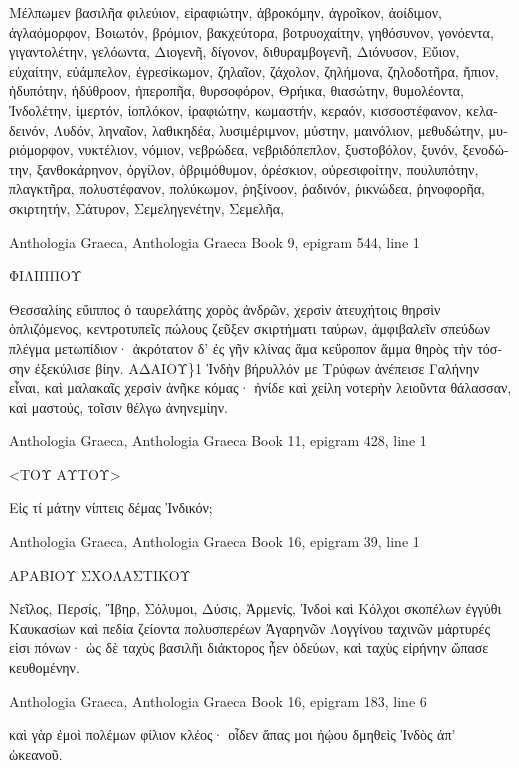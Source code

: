 \documentclass[12pt,letterpaper,twoside,final]{memoir}
\begin{document}
\begin{greek}
Μέλπωμεν βασιλῆα φιλεύιον, εἰραφιώτην, 
ἁβροκόμην, ἀγροῖκον, ἀοίδιμον, ἀγλαόμορφον, 
Βοιωτόν, βρόμιον, βακχεύτορα, βοτρυοχαίτην, 
γηθόσυνον, γονόεντα, γιγαντολέτην, γελόωντα, 
Διογενῆ, δίγονον, διθυραμβογενῆ, Διόνυσον, 
Εὔιον, εὐχαίτην, εὐάμπελον, ἐγρεσίκωμον, 
ζηλαῖον, ζάχολον, ζηλήμονα, ζηλοδοτῆρα, 
ἤπιον, ἡδυπότην, ἡδύθροον, ἠπεροπῆα, 
θυρσοφόρον, Θρήικα, θιασώτην, θυμολέοντα, 
Ἰνδολέτην, ἱμερτόν, ἰοπλόκον, ἰραφιώτην, 
κωμαστήν, κεραόν, κισσοστέφανον, κελαδεινόν, 
Λυδόν, ληναῖον, λαθικηδέα, λυσιμέριμνον, 
μύστην, μαινόλιον, μεθυδώτην, μυριόμορφον, 
νυκτέλιον, νόμιον, νεβρώδεα, νεβριδόπεπλον, 
ξυστοβόλον, ξυνόν, ξενοδώτην, ξανθοκάρηνον, 
ὀργίλον, ὀβριμόθυμον, ὀρέσκιον, οὐρεσιφοίτην, 
πουλυπότην, πλαγκτῆρα, πολυστέφανον, πολύκωμον, 
ῥηξίνοον, ῥαδινόν, ῥικνώδεα, ῥηνοφορῆα, 
σκιρτητήν, Σάτυρον, Σεμεληγενέτην, Σεμελῆα, 




Anthologia Graeca, Anthologia Graeca 
Book 9, epigram 544, line 1

ΦΙΛΙΠΠΟΥ


Θεσσαλίης εὔιππος ὁ ταυρελάτης χορὸς ἀνδρῶν, 
 χερσὶν ἀτευχήτοις θηρσὶν ὁπλιζόμενος, 
κεντροτυπεῖς πώλους ζεῦξεν σκιρτήματι ταύρων, 
 ἀμφιβαλεῖν σπεύδων πλέγμα μετωπίδιον· 
ἀκρότατον δ' ἐς γῆν κλίνας ἅμα κεὔροπον ἅμμα 
 θηρὸς τὴν τόσσην ἐξεκύλισε βίην.   
ΑΔΑΙΟΥ\}1 
Ἰνδὴν βήρυλλόν με Τρύφων ἀνέπεισε Γαλήνην 
 εἶναι, καὶ μαλακαῖς χερσὶν ἀνῆκε κόμας· 
ἠνίδε καὶ χείλη νοτερὴν λειοῦντα θάλασσαν, 
 καὶ μαστούς, τοῖσιν θέλγω ἀνηνεμίην. 




Anthologia Graeca, Anthologia Graeca 
Book 11, epigram 428, line 1

<ΤΟΥ ΑΥΤΟΥ>


Εἰς τί μάτην νίπτεις δέμας Ἰνδικόν; 



Anthologia Graeca, Anthologia Graeca 
Book 16, epigram 39, line 1

ΑΡΑΒΙΟΥ ΣΧΟΛΑΣΤΙΚΟΥ


Νεῖλος, Περσίς, Ἴβηρ, Σόλυμοι, Δύσις, Ἀρμενίς, Ἰνδοὶ 
 καὶ Κόλχοι σκοπέλων ἐγγύθι Καυκασίων 
καὶ πεδία ζείοντα πολυσπερέων Ἀγαρηνῶν 
 Λογγίνου ταχινῶν μάρτυρές εἰσι πόνων· 
ὡς δὲ ταχὺς βασιλῆι διάκτορος ἦεν ὁδεύων, 
 καὶ ταχὺς εἰρήνην ὤπασε κευθομένην. 



Anthologia Graeca, Anthologia Graeca 
Book 16, epigram 183, line 6

καὶ γὰρ ἐμοὶ πολέμων φίλιον κλέος· οἶδεν ἅπας μοι 
 ἠῴου δμηθεὶς Ἰνδὸς ἀπ' ὠκεανοῦ. 

\end{greek}
\end{document}
